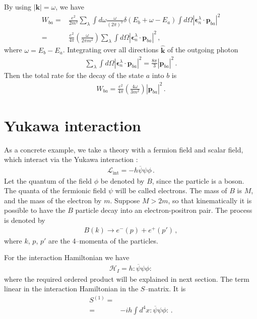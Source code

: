By using $|\mathbf{k}|=\omega$, we have
\begin{align}
  W_{ba}=&\frac{e^2}{2m^2}\sum_{\lambda}\int d\omega\frac{\omega}{(2\pi)^2}\delta(E_b+\omega-E_a)\int d\Omega|\boldsymbol{\epsilon}^{\lambda}_{n}\cdot\mathbf{p}_{ba}|^2\nonumber\\
=&\frac{e^2}{4\pi}\left(\frac{\omega}{2\pi m^2}\right)\sum_{\lambda}\int d\Omega|\boldsymbol{\epsilon}^{\lambda}_{n}\cdot\mathbf{p}_{ba}|^2\,,
\end{align}
where $\omega=E_b-E_a$.
Integrating over all directions $\widehat{\mathbf{k}}$ of the outgoing photon
\begin{align}
  \sum_{\lambda}\int d\Omega|\boldsymbol{\epsilon}^{\lambda}_{n}\cdot\mathbf{p}_{ba}|^2=\frac{8\pi}{3}|\mathbf{p}_{ba}|^2\,.
\end{align}
Then the total rate for the decay of the state $a$ into $b$ is
\begin{align}
  W_{ba}=\frac{e^2}{4\pi}\left(\frac{4\omega}{3 m^2}\right)|\mathbf{p}_{ba}|^2\,.
\end{align}



\section{Yukawa interaction}
\label{sec:feynman-diagrams}
As a concrete example, we take a theory with a fermion field and scalar field, which interact via the Yukawa interaction \cite{Lahiri:2005sm}:
\begin{align}
  \mathcal{L}_{\text{int}}=-h \overline{\psi}\psi\phi\,.
\end{align}
Let the quantum of the field $\phi$ be denoted by $B$, since the particle is a boson. The quanta of the fermionic field $\psi$ will be called electrons. The mass of $B$ is $M$, and the mass of the electron by $m$. Suppose $M\gt 2m$,  so that kinematically it is possible to have the $B$ particle decay into an electron-positron pair. The process is denoted by
\begin{align}
  B(k)\to e^-(p)+e^+(p')\,,
\end{align}
where $k$, $p$, $p'$ are the 4--momenta of the particles.

For the interaction Hamiltonian we have
\begin{align}
  \mathcal{H}_I=h:\overline{\psi}\psi\phi:
\end{align}
where the required ordered product will be explained in next section.
The term linear in the interaction Hamiltonian in the $S$--matrix.  It is
\begin{align}
  S^{(1)}=\nonumber\\
=&-i h \int d^4x:\overline{\psi}\psi\phi:\,.
\end{align}

